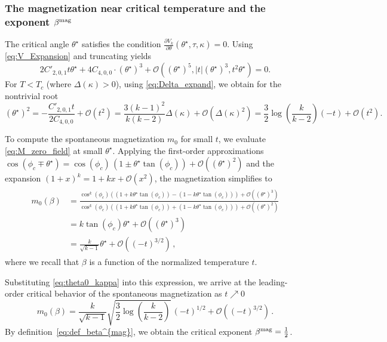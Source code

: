 \documentclass{article}
\numberwithin{theorem}{section}
\theoremstyle{remark}
\begin{document}
\subsubsection{The magnetization near critical temperature and the exponent \texorpdfstring{$\beta^{\rm mag}$}{βᵐᵃᵍ}}

The critical angle $\theta^\star$ satisfies the condition $\frac{\partial V_k}{\partial \theta}(\theta^\star,\tau,\kappa) = 0$. Using \eqref{eq:V_Expansion} and truncating yields
\[
  2 C'_{2,0,1} t \theta^\star + 4 C_{4,0,0}\cdot (\theta^\star)^3 + \mathcal{O}((\theta^\star)^5, |t|(\theta^\star)^3, t^2 \theta^\star) = 0.
\]
For $T < T_c$ (where $\Delta (\kappa) > 0$), using \eqref{eq:Delta_expand}, we obtain for the nontrivial root
\begin{equation}
  \label{eq:theta0_kappa}
  (\theta^\star)^2 = -\frac{C'_{2,0,1}t}{2 C_{4,0,0}} + \mathcal{O}(t^2) = \frac{3(k-1)^2}{k(k-2)} \Delta (\kappa) + \mathcal{O}(\Delta(\kappa)^2) = \frac{3}{2} \log\left(\frac{k}{k-2}\right) (-t) + \mathcal{O}(t^2). 
\end{equation}

To compute the spontaneous magnetization $m_0$ for small $t$, we evaluate \eqref{eq:M_zero_field} at small $\theta^\star$. Applying the first-order approximations $\cos(\phi_c \mp \theta^\star) = \cos(\phi_c) \, (1 \pm \theta^\star \tan(\phi_c)) + \mathcal{O}((\theta^\star)^2)$ and the expansion $(1+x)^k = 1+kx + \mathcal{O}(x^2)$, the magnetization simplifies to
\begin{align*}
 \begin{aligned}
    m_0(\beta) &= \frac{\cos^k(\phi_c) \left( (1 + k \theta^\star \tan(\phi_c)) - (1 - k \theta^\star \tan(\phi_c)) \right) + \mathcal{O}((\theta^\star)^3)}{\cos^k(\phi_c) \left( (1 + k \theta^\star \tan(\phi_c)) + (1 - k \theta^\star \tan(\phi_c)) \right) + \mathcal{O}((\theta^\star)^2)} \\
    &= k \tan(\phi_c) \theta^\star + \mathcal{O}((\theta^\star)^3)  \\
    &= \frac{k}{\sqrt{k-1}} \theta^\star + \mathcal{O}((-t)^{3/2})\,,
\end{aligned}
\end{align*}
where we recall that $\beta$ is a function of the normalized temperature $t$.

Substituting \eqref{eq:theta0_kappa} into this expression, we arrive at the leading-order critical behavior of the spontaneous magnetization as $t \nearrow 0$
\[
  m_0(\beta) = \frac{k}{\sqrt{k-1}} \sqrt{\frac{3}{2} \log\left(\frac{k}{k-2}\right)} \, (-t)^{1/2} + \mathcal{O}((-t)^{3/2})\,.
\]
By definition~\eqref{eq:def_beta^{mag}}, we obtain the critical exponent $\beta^{\rm mag} = \frac{1}{2}$.
\end{document}
